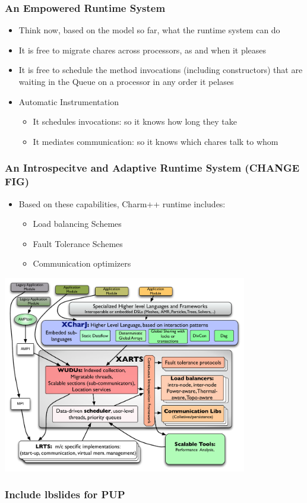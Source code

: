 

\begin{frame}[fragile]
\frametitle{An Empowered Runtime System}

\begin{itemize}
\item Think now, based on the model so far, what the runtime system
  can do
\item It is free to migrate chares across processors, as and when it pleases
\item It is free to schedule the method invocations (including
  constructors) that are waiting in the Queue on a processor in any
  order it pelases
\item Automatic Instrumentation
\begin{itemize}
\item It schedules invocations: so it knows how long they take
\item It mediates communication: so it knows which chares talk to whom
\end{itemize}

\end{itemize}

\end{frame}

\begin{frame}[fragile]
\frametitle{An Introspecitve and Adaptive Runtime System (CHANGE FIG)}
\begin{itemize}
\item Based on these capabilities, Charm++ runtime includes:
\begin{itemize}
\item Load balancing Schemes
\item Fault Tolerance Schemes
\item Communication optimizers
\end{itemize}
\end{itemize}

\includegraphics[width=0.8\textwidth]{figures/arts}

\end{frame}


\begin{frame}[fragile]
\frametitle{Include lbslides for PUP}
\end{frame}

